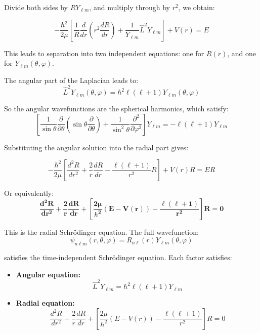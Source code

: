\documentclass[12pt]{article}
\begin{document}
        Divide both sides by \( R Y_{\ell m} \), and multiply through by \( r^2 \), we obtain:
        
        \[
            -\frac{\hbar^2}{2\mu} \left[
            \frac{1}{R} \frac{d}{dr} \left( r^2 \frac{dR}{dr} \right)
            + \frac{1}{Y_{\ell m}} \hat{L}^2 Y_{\ell m}
            \right] + V(r) = E
        \]
        
        This leads to separation into two independent equations: one for \( R(r) \), and one for \( Y_{\ell m}(\theta, \varphi) \).
        
        The angular part of the Laplacian leads to:
        \[
            \hat{L}^2 Y_{\ell m}(\theta, \varphi) = \hbar^2 \ell(\ell + 1) Y_{\ell m}(\theta, \varphi)
        \]
        
        So the angular wavefunctions are the spherical harmonics, which satisfy:
        \[
            \left[
            \frac{1}{\sin \theta} \frac{\partial}{\partial \theta} \left( \sin \theta \frac{\partial}{\partial \theta} \right)
            + \frac{1}{\sin^2 \theta} \frac{\partial^2}{\partial \varphi^2}
            \right] Y_{\ell m} = -\ell(\ell + 1) Y_{\ell m}
        \]
        
        Substituting the angular solution into the radial part gives:
        
        \[
            -\frac{\hbar^2}{2\mu} \left[
            \frac{d^2 R}{dr^2} + \frac{2}{r} \frac{dR}{dr} - \frac{\ell(\ell + 1)}{r^2} R
            \right] + V(r) R = E R
        \]
        
        Or equivalently:
        \[
            \boldsymbol{\boxed{\frac{d^2 R}{dr^2} + \frac{2}{r} \frac{dR}{dr} + \left[
            \frac{2\mu}{\hbar^2}(E - V(r)) - \frac{\ell(\ell + 1)}{r^2}
            \right] R = 0}}
        \]
        
        This is the radial Schrödinger equation. The full wavefunction:
        \[
            \psi_{n\ell m}(r, \theta, \varphi) = R_{n\ell}(r) Y_{\ell m}(\theta, \varphi)
        \]
        
        satisfies the time-independent Schrödinger equation. Each factor satisfies:
        \begin{itemize}
          \item \textbf{Angular equation:}
          \[
            \hat{L}^2 Y_{\ell m} = \hbar^2 \ell(\ell + 1) Y_{\ell m}
          \]
          \item \textbf{Radial equation:}
          \[
              \frac{d^2 R}{dr^2} + \frac{2}{r} \frac{dR}{dr} + \left[
              \frac{2\mu}{\hbar^2}(E - V(r)) - \frac{\ell(\ell + 1)}{r^2}
              \right] R = 0
          \]
        \end{itemize}
\end{document}
